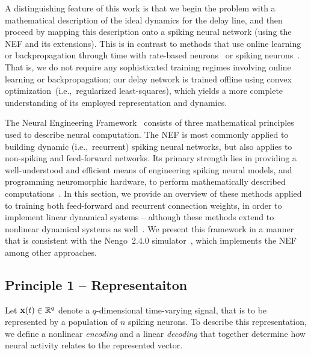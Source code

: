 A distinguishing feature of this work is that we begin the problem with a mathematical description of the ideal dynamics for the delay line, and then proceed by mapping this description onto a spiking neural network (using the NEF and its extensions).
This is in contrast to methods that use online learning or backpropagation through time with rate-based neurons~\citep{de1992gamma, sussillo2009generating} or spiking neurons~\citep{nicola2016supervised, huh2017gradient, gilra2017predicting, alemi2017learning}.
That is, we do not require any sophisticated training regimes involving online learning or backpropagation; our delay network is trained offline using convex optimization~(i.e.,~regularized least-squares), which yields a more complete understanding of its employed representation and dynamics.

The Neural Engineering Framework~\citep[NEF;][]{eliasmith1999developing, eliasmith2003neural} consists of three mathematical principles used to describe neural computation.
The NEF is most commonly applied to building dynamic (i.e.,~recurrent) spiking neural networks, but also applies to non-spiking and feed-forward networks.
Its primary strength lies in providing a well-understood and efficient means of engineering spiking neural models, and programming neuromorphic hardware, to perform mathematically described computations~\citep{eliasmith2013build, boahen2017neuromorph}.
In this section, we provide an overview of these methods applied to training both feed-forward and recurrent connection weights, in order to implement linear dynamical systems -- although these methods extend to nonlinear dynamical systems as well~\citep{voelker2017iscas, voelker2017neuromorphic}.
We present this framework in a manner that is consistent with the Nengo~2.4.0 simulator~\citep{bekolay2013nengo}, which implements the NEF among other approaches.

\subsection{Principle 1 -- Representaiton}
\label{sec:principle1}

Let $\mathbf{x}(t) \in \mathbb{R}^q$ denote a $q$-dimensional time-varying signal, that is to be represented by a population of $n$ spiking neurons.
To describe this representation, we define a nonlinear \emph{encoding} and a linear \emph{decoding} that together determine how neural activity relates to the represented vector.

